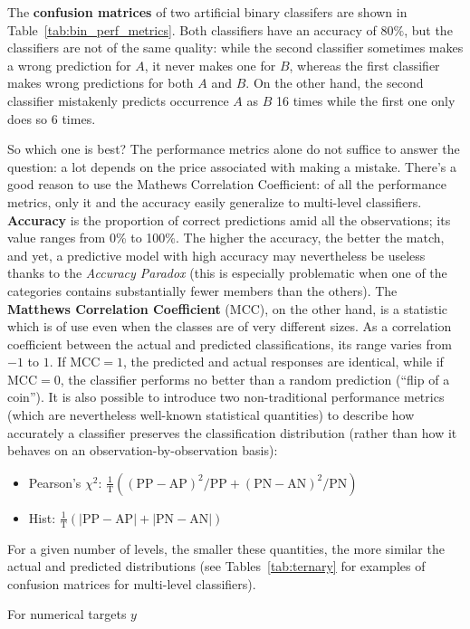 The \textbf{confusion matrices} of two artificial binary classifers are shown in Table~\ref{tab:bin_perf_metrics}. Both classifiers have an accuracy of $80\%$, but the classifiers are not of the same quality: while the second classifier sometimes makes a wrong prediction for $A$, it never makes one for $B$, whereas the first classifier makes wrong predictions for both $A$ and $B$. On the other hand, the second classifier mistakenly predicts occurrence $A$ as $B$ 16 times while the first one only does so 6 times. \par So which one is best? The performance metrics alone do not suffice to answer the question: a lot depends on the price associated with making a mistake. There's a good reason to use the Mathews Correlation Coefficient: of all the performance metrics, only it and the accuracy easily generalize to multi-level classifiers.  
\newpage\noindent \textbf{Accuracy} is the proportion of correct predictions amid all the observations; its value ranges from 0\% to 100\%. The higher the accuracy, the better the match, and yet, a predictive model with high accuracy may nevertheless be useless thanks to the \textit{Accuracy Paradox} (this is especially problematic when one of the categories contains substantially fewer members than the others). The 
\textbf{Matthews Correlation Coefficient} (MCC), on the other hand,  is a statistic which is of use even when the classes are of very different sizes. As a correlation coefficient  between the actual and predicted classifications, its range varies from $−1$ to $1$. If $\textrm{MCC}=1$, the predicted and actual responses are identical, while if $\textrm{MCC}=0$, the classifier performs no better than a random prediction (``flip of a coin''). It is also possible to introduce two non-traditional performance metrics (which are nevertheless well-known statistical quantities) to describe how accurately a classifier preserves the classification distribution (rather than how it behaves on an observation-by-observation basis):
\begin{itemize}[noitemsep]
\item Pearson's $\chi^2$: $\frac{1}{\textrm{T}}\left((\textrm{PP}-\textrm{AP})^2/\textrm{PP} + (\textrm{PN}-\textrm{AN})^2/\textrm{PN}\right)$ 
\item Hist: $\frac{1}{\textrm{T}}\left(\left|\textrm{PP}-\textrm{AP}\right|+\left|\textrm{PN}-\textrm{AN}\right|\right)$
\end{itemize}
For a given number of levels, the smaller these quantities, the more similar the actual and predicted distributions (see Tables~\ref{tab:ternary} for examples of confusion matrices for multi-level classifiers). \par For numerical targets $y$
